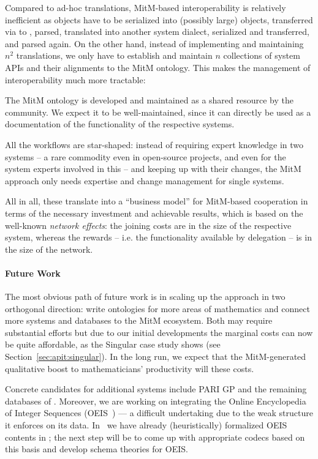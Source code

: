Compared to ad-hoc translations, MitM-based interoperability is relatively inefficient as objects have to be serialized into (possibly large) \OMMT objects, transferred via \SCSCP to \MMT, parsed, translated into another system dialect, serialized and transferred, and parsed again.
On the other hand, instead of implementing and maintaining $n^2$ translations, we only have to establish and maintain $n$ collections of system APIs and their alignments to the
MitM ontology.
This makes the management of interoperability much more tractable:
\begin{compactenum}
\item The MitM ontology is developed and maintained as a shared resource by the community.
We expect it to be well-maintained, since it can directly be used as a documentation of the functionality of the respective systems.
\item All the workflows are star-shaped: instead of requiring expert knowledge in two systems -- a rare commodity even in open-source projects, and even for the system experts involved in this \papertype -- and keeping up with their changes, the MitM approach only needs expertise and change management for single systems.
\end{compactenum}
All in all, these translate into a ``business model'' for MitM-based cooperation in terms of the necessary investment and achievable results, which is based on the well-known \emph{network effects}: the joining costs are in the size of the respective system, whereas the rewards -- i.e. the functionality available by delegation -- is in the size of the network.

\paragraph{Future Work}
The most obvious path of future work is in scaling up the approach in two orthogonal direction: write ontologies for more areas of mathematics and connect more systems and databases to the MitM ecosystem.
Both may require substantial efforts but due to our initial developments the marginal costs can now be quite affordable, as the Singular case study shows (see Section~\ref{sec:apit:singular}). 
In the long run, we expect that the MitM-generated qualitative boost to mathematicians' productivity will these costs.

Concrete candidates for additional systems include PARI GP and the remaining databases of \lmfdb.
Moreover, we are working on integrating the Online Encyclopedia of Integer Sequences (OEIS~\cite{Sloane:OEIS,oeis}) --- a difficult undertaking due to the weak structure it enforces on its data.
In~\cite{LuzKoh:fsarfo16} we have already (heuristically) formalized OEIS contents in \ommt; the next step will be to come up with appropriate codecs based on this basis and develop schema theories for OEIS.

